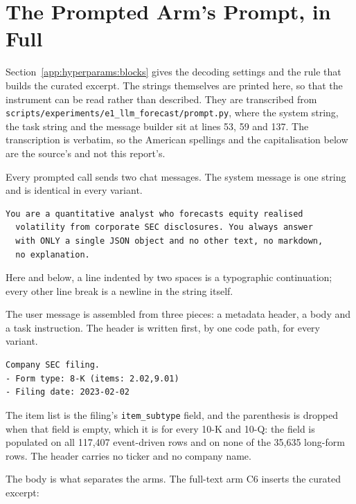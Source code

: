 \FloatBarrier
\section{The Prompted Arm's Prompt, in Full}
\label{app:hyperparams:prompt}

Section~\ref{app:hyperparams:blocks} gives the decoding settings and the rule
that builds the curated excerpt. The strings themselves are printed here, so
that the instrument can be read rather than described. They are transcribed
from \texttt{scripts/experiments/e1\_llm\_forecast/prompt.py}, where the system
string, the task string and the message builder sit at lines 53, 59 and 137. %
The transcription is verbatim, so the American spellings and the capitalisation
below are the source's and not this report's.

Every prompted call sends two chat messages. The system message is one string
and is identical in every variant.

\begin{verbatim}
You are a quantitative analyst who forecasts equity realised
  volatility from corporate SEC disclosures. You always answer
  with ONLY a single JSON object and no other text, no markdown,
  no explanation.
\end{verbatim}

Here and below, a line indented by two spaces is a typographic continuation;
every other line break is a newline in the string itself.

The user message is assembled from three pieces: a metadata header, a body and
a task instruction. The header is written first, by one code path, for every
variant.

\begin{verbatim}
Company SEC filing.
- Form type: 8-K (items: 2.02,9.01)
- Filing date: 2023-02-02
\end{verbatim}

The item list is the filing's \texttt{item\_subtype} field, and the parenthesis
is dropped when that field is empty, which it is for every 10-K and 10-Q: the
field is populated on all 117{,}407 event-driven rows and on none of the
35{,}635 long-form rows. %
The header carries no ticker and no company name.

The body is what separates the arms. The full-text arm C6 inserts the curated
excerpt:

